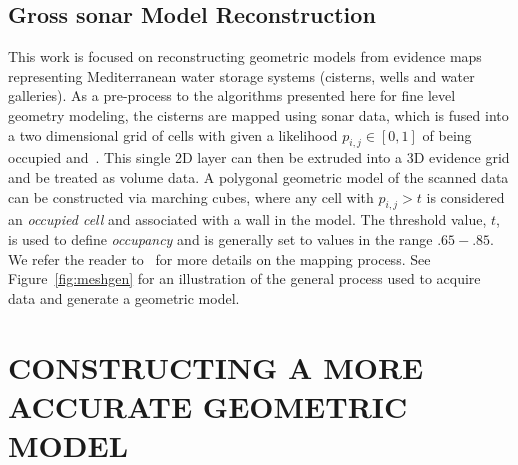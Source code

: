 \documentclass[a4paper,twoside]{article}
\begin{document}
\subsection{{Gross sonar Model Reconstruction}}
\label{sec:reconstruction}

\begin{figure*}[ht!]
   \vspace{-0.2cm}
   \caption{How we generate meshes from sonar models.}
  \label{fig:meshgen}
 \end{figure*}
 
\noindent This work is focused on reconstructing geometric models from evidence maps representing Mediterranean water storage systems (cisterns, wells and water galleries).  As a pre-process to the algorithms presented here for fine level geometry modeling, the cisterns are mapped using sonar data, which is fused into a two dimensional grid of cells with given a likelihood $p_{i,j} \in [0,1]$ of being occupied \cite{Thrun2005} and~\cite{White10}.  This single 2D layer can then be extruded into a 3D evidence grid and be treated as volume data.  A polygonal geometric model of the scanned data can be constructed via marching cubes, where any cell with $p_{i,j} > t$ is considered an \emph{occupied cell} and associated with a wall in the model.   The threshold value, $t$, is used to define \emph{occupancy} and is generally set to values in the range $.65-.85$. We refer the reader to~\cite{ICEX11,McVicker,McVicker2} for more details on the mapping process.  See Figure~\ref{fig:meshgen} for an illustration of the general process used to acquire data and generate a geometric model.


\section{\uppercase{Constructing a more accurate geometric model}}
\label{sec:detail}
\end{document}
